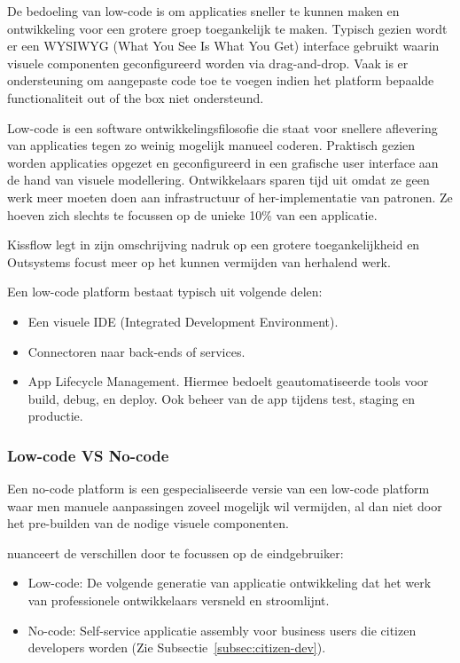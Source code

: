 De bedoeling van low-code is om applicaties sneller te kunnen maken en ontwikkeling voor een grotere groep toegankelijk te maken. Typisch gezien wordt er een WYSIWYG (What You See Is What You Get) interface gebruikt waarin visuele componenten geconfigureerd worden via drag-and-drop. Vaak is er ondersteuning om aangepaste code toe te voegen indien het platform bepaalde functionaliteit out of the box niet ondersteund. \autocite{Kissflow2018}

Low-code is een software ontwikkelingsfilosofie die staat voor snellere aflevering van applicaties tegen zo weinig mogelijk manueel coderen. Praktisch gezien worden applicaties opgezet en geconfigureerd in een grafische user interface aan de hand van visuele modellering. Ontwikkelaars sparen tijd uit omdat ze geen werk meer moeten doen aan infrastructuur of her-implementatie van patronen. Ze hoeven zich slechts te focussen op de unieke 10\% van een applicatie. \autocite{Revell2020}

Kissflow legt in zijn omschrijving nadruk op een grotere toegankelijkheid en Outsystems focust meer op het kunnen vermijden van herhalend werk.

Een low-code platform bestaat typisch uit volgende delen:
\begin{itemize}
    \item Een visuele IDE (Integrated Development Environment).
    \item Connectoren naar back-ends of services.
    \item App Lifecycle Management. Hiermee bedoelt geautomatiseerde tools voor build, debug, en deploy. Ook beheer van de app tijdens test, staging en productie.
\end{itemize} \autocite{Revell2020}

\subsubsection{Low-code VS No-code}

Een no-code platform is een gespecialiseerde versie van een low-code platform waar men manuele aanpassingen zoveel mogelijk wil vermijden, al dan niet door het pre-builden van de nodige visuele componenten.

\textcite{Bloomberg2017} nuanceert de verschillen door te focussen op de eindgebruiker:
\begin{itemize}
    \item Low-code: De volgende generatie van applicatie ontwikkeling dat het werk van professionele ontwikkelaars versneld en stroomlijnt.
    \item No-code: Self-service applicatie assembly voor business users die citizen developers worden (Zie Subsectie~\ref{subsec:citizen-dev}).
\end{itemize}

